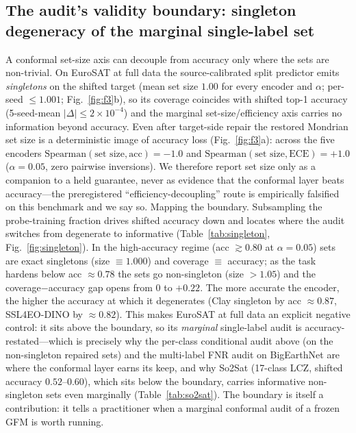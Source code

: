 \documentclass[journal]{IEEEtran}
\renewcommand{\_}{\textunderscore\allowbreak}
\begin{document}
\subsection{The audit's validity boundary: singleton degeneracy of the marginal single-label set}
A conformal set-size axis can decouple from accuracy only where the sets are non-trivial. On EuroSAT at
full data the source-calibrated split predictor emits \emph{singletons} on the shifted target (mean set
size $1.00$ for every encoder and $\alpha$; per-seed $\le1.001$; Fig.~\ref{fig:f3}b), so its coverage coincides with shifted
top-1 accuracy (5-seed-mean $|\Delta|\le2\times10^{-4}$) and the marginal set-size/efficiency axis carries
no information beyond accuracy. Even after target-side repair the restored Mondrian set size is a
deterministic image of accuracy loss (Fig.~\ref{fig:f3}a): across the five encoders $\mathrm{Spearman}(\text{set size},\text{acc})=-1.0$
and $\mathrm{Spearman}(\text{set size},\text{ECE})=+1.0$ ($\alpha{=}0.05$, zero pairwise inversions). We
therefore report set size only as a companion to a held guarantee, never as evidence that the conformal
layer beats accuracy---the preregistered ``efficiency-decoupling'' route is empirically falsified on this
benchmark and we say so.
Mapping the boundary. Subsampling the probe-training fraction drives shifted accuracy down and
locates where the audit switches from degenerate to informative (Table~\ref{tab:singleton},
Fig.~\ref{fig:singleton}). In the
high-accuracy regime (acc $\gtrsim0.80$ at $\alpha{=}0.05$) sets are exact singletons (size $\equiv1.000$)
and coverage $\equiv$ accuracy; as the task hardens below acc $\approx0.78$ the sets go non-singleton
(size $>1.05$) and the coverage$-$accuracy gap opens from $0$ to $+0.22$. The more accurate the encoder,
the higher the accuracy at which it degenerates (Clay singleton by acc $\approx0.87$, SSL4EO-DINO by
$\approx0.82$). This makes EuroSAT at full data an explicit negative control: it sits above
the boundary, so its \emph{marginal} single-label audit is accuracy-restated---which is precisely why the
per-class conditional audit above (on the non-singleton repaired sets) and the multi-label FNR audit
on BigEarthNet are where the conformal layer earns its keep, and why So2Sat (17-class LCZ, shifted accuracy
$0.52$--$0.60$), which sits below the boundary, carries informative non-singleton sets even
marginally (Table~\ref{tab:so2sat}). The boundary is itself a contribution: it tells a practitioner when a
marginal conformal audit of a frozen GFM is worth running.
\end{document}
